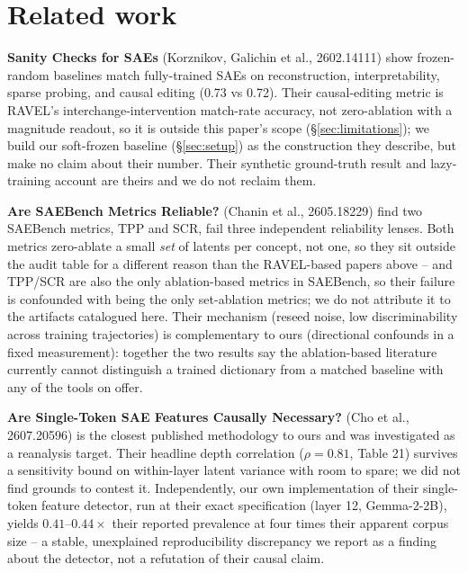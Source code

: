 \documentclass[11pt]{article}
\begin{document}
\section{Related work}
\label{sec:relwork}
\textbf{Sanity Checks for SAEs} (Korznikov, Galichin et al., 2602.14111) show
frozen-random baselines match fully-trained SAEs on reconstruction,
interpretability, sparse probing, and causal editing (0.73 vs 0.72). Their
causal-editing metric is RAVEL's interchange-intervention match-rate accuracy,
not zero-ablation with a magnitude readout, so it is outside this paper's
scope (\S\ref{sec:limitations}); we build our soft-frozen baseline
(\S\ref{sec:setup}) as the construction they describe, but make no claim about
their number. Their synthetic ground-truth result and lazy-training account are
theirs and we do not reclaim them.

\textbf{Are SAEBench Metrics Reliable?} (Chanin et al., 2605.18229) find two
SAEBench metrics, TPP and SCR, fail three independent reliability lenses. Both
metrics zero-ablate a small \emph{set} of latents per concept, not one, so they
sit outside the audit table for a different reason than the RAVEL-based papers
above -- and TPP/SCR are also the only ablation-based metrics in SAEBench, so
their failure is confounded with being the only set-ablation metrics; we do not
attribute it to the artifacts catalogued here. Their mechanism (reseed noise,
low discriminability across training trajectories) is complementary to ours
(directional confounds in a fixed measurement): together the two results say
the ablation-based literature currently cannot distinguish a trained dictionary
from a matched baseline with any of the tools on offer.

\textbf{Are Single-Token SAE Features Causally Necessary?} (Cho et al.,
2607.20596) is the closest published methodology to ours and was investigated
as a reanalysis target. Their headline depth correlation ($\rho=0.81$,
Table 21) survives a sensitivity bound on within-layer latent variance with
room to spare; we did not find grounds to contest it. Independently, our own
implementation of their single-token feature detector, run at their exact
specification (layer 12, Gemma-2-2B), yields $0.41$--$0.44\times$ their
reported prevalence at four times their apparent corpus size -- a stable,
unexplained reproducibility discrepancy we report as a finding about the
detector, not a refutation of their causal claim.
\end{document}
